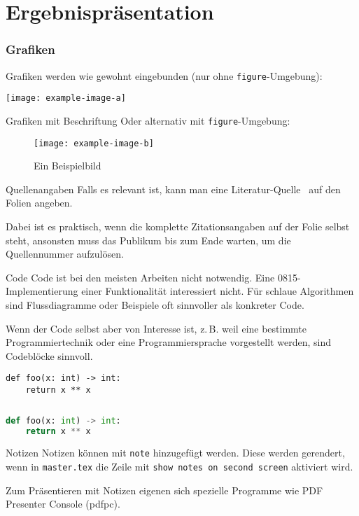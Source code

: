 \section{Ergebnispräsentation}

\begin{frame}
  \frametitle{Grafiken}
  Grafiken werden wie gewohnt eingebunden (nur ohne \texttt{figure}-Umgebung):
  \begin{center}
	    \texttt{[image: example-image-a]}
  \end{center}
\end{frame}

\begin{frame}{Grafiken mit Beschriftung}
Oder alternativ mit \texttt{figure}-Umgebung:
\begin{figure}
\texttt{[image: example-image-b]}
\caption{Ein Beispielbild}
\end{figure}
\end{frame}

\begin{frame}{Quellenangaben}
Falls es relevant ist, kann man eine Literatur-Quelle~ auf den Folien angeben.

Dabei ist es praktisch, wenn die komplette Zitationsangaben auf der Folie selbst steht, ansonsten muss das Publikum bis zum Ende warten, um die Quellennummer aufzulösen.
\end{frame}

\begin{frame}[fragile]{Code} %
    Code ist bei den meisten Arbeiten nicht notwendig. Eine 0815-Implementierung einer Funktionalität interessiert nicht. Für schlaue Algorithmen sind Flussdiagramme oder Beispiele oft sinnvoller als konkreter Code.
    
    Wenn der Code selbst aber von Interesse ist, z.\,B. weil eine bestimmte Programmiertechnik oder eine Programmiersprache vorgestellt werden, sind Codeblöcke sinnvoll.
    
\begin{verbatim}
def foo(x: int) -> int:
    return x ** x
\end{verbatim}

\inputminted[linenos=true]{java}{example.java}

\begin{lstlisting}[language=python]
def foo(x: int) -> int:
    return x ** x
\end{lstlisting}
\end{frame}

\begin{frame}{Notizen}
  Notizen können mit \texttt{note} hinzugefügt werden. Diese werden gerendert, wenn in \texttt{master.tex} die Zeile mit \texttt{show notes on second screen} aktiviert wird.
  
  Zum Präsentieren mit Notizen eigenen sich spezielle Programme wie PDF Presenter Console (pdfpc).
  
\end{frame}
